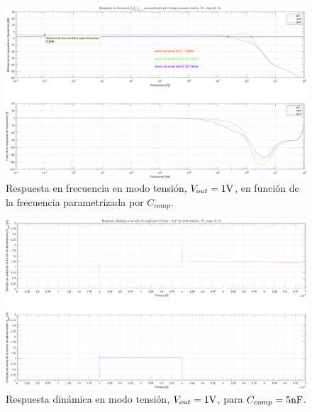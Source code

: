 \begin{figure}[H] %
\begin{center}
\includegraphics[width=1.1 \textwidth, angle=90]{./img/plots/rf/power_supply_CCOMP_RF_Modo2.png}
\caption{\label{fig:fig_power_supply_CCOMP_RF_Modo2}\footnotesize{Respuesta en frecuencia en modo tensión, $V_{out} = 1 \si[per-mode=symbol]{\volt}$, en función de la frecuencia parametrizada por $C_{comp}$.}}
\end{center}
\end{figure}

\clearpage

\begin{figure}[H] %
\begin{center}
\includegraphics[width=1.1 \textwidth, angle=90]{./img/plots/dynamic/power_supply_CCOMP_5n_STEP_Modo2.png}
\caption{\label{fig:fig_power_supply_CCOMP_STEP_5n_Modo2}\footnotesize{Respuesta dinámica en modo tensión, $V_{out} = 1 \si[per-mode=symbol]{\volt}$, para $C_{comp} = 5 \si[per-mode=symbol]{\nano\farad} $.}}
\end{center}
\end{figure}

